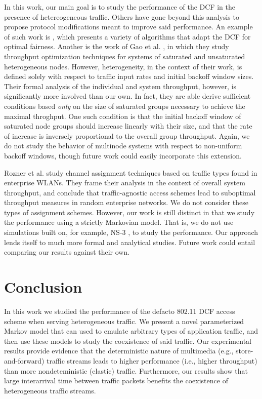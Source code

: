 \documentclass{llncs}
\begin{document}
In this work, our main goal is to study the performance of the DCF in the presence of hetereogeneous traffic. Others have gone beyond this analysis to propose protocol modifications meant to improve said performance. An example of such work is \cite{li2008predictable}, which presents a variety of algorithms that adapt the DCF for optimal fairness. Another is the work of Gao et al. \cite{gao2013throughput}, in which they study throughput optimization techniques for systems of saturated and unsaturated heterogeneous nodes. However, heterogeneity, in the context of their work, is defined solely with respect to traffic input rates and initial backoff window sizes. Their formal analysis of the individual and system throughput, however, is significantly more involved than our own. In fact, they are able derive sufficient conditions based \emph{only} on the size of saturated groups necessary to achieve the maximal throghput. One such condition is that the initial backoff window of saturated node groups should increase linearly with their size, and that the rate of increase is inversely proportional to the overall group throughput. Again, we do not study the behavior of multinode systems with respect to non-uniform backoff windows, though future work could easily incorporate this extension.

Rozner et al. \cite{rozner2007traffic} study channel assignment techniques based on traffic types found in enterprise WLANs. They frame their analysis in the context of overall system throughput, and conclude that traffic-agnostic access schemes lead to suboptimal throughput measures in random enterprise networks. We do not consider these types of assignment schemes. However, our work is still distinct in that we study the performance using a strictly Markovian model. That is, we do not use simulations built on, for example, NS-3 \cite{henderson2008network}, to study the performance. Our approach lends itself to much more formal and analytical studies. Future work could entail comparing our results against their own.

\section{Conclusion}
In this work we studied the performance of the defacto 802.11 DCF access scheme when serving heterogeneous traffic. We present a novel parameterized Markov model that can used to emulate arbitrary types of application traffic, and then use these models to study the coexistence of said traffic. Our experimental results provide evidence that the deterministic nature of multimedia (e.g., store-and-forward) traffic streams leads to higher performance (i.e., higher throughput) than more nondeteministic (elastic) traffic. Furthermore, our results show that large interarrival time between traffic packets benefits the coexistence of heterogeneous traffic streams. 




\end{document}
